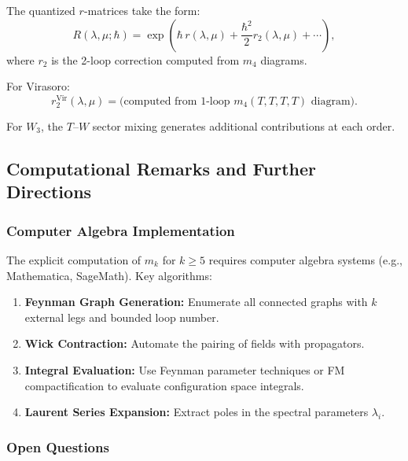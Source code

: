 The quantized $r$-matrices take the form:
\begin{equation}
R(\lambda,\mu; \hbar) = \exp\left( \hbar \, r(\lambda,\mu) + \frac{\hbar^2}{2} r_2(\lambda,\mu) + \cdots \right),
\end{equation}
where $r_2$ is the 2-loop correction computed from $m_4$ diagrams.

For Virasoro:
\begin{equation}
r_2^{\text{Vir}}(\lambda,\mu) = \text{(computed from 1-loop } m_4(T,T,T,T) \text{ diagram)}.
\end{equation}

For $W_3$, the $T$--$W$ sector mixing generates additional contributions at each order.

\subsection{Computational Remarks and Further Directions}

\subsubsection{Computer Algebra Implementation}

The explicit computation of $m_k$ for $k \geq 5$ requires computer algebra systems (e.g., Mathematica, SageMath). Key algorithms:
\begin{enumerate}
\item \textbf{Feynman Graph Generation:} Enumerate all connected graphs with $k$ external legs and bounded loop number.
\item \textbf{Wick Contraction:} Automate the pairing of fields with propagators.
\item \textbf{Integral Evaluation:} Use Feynman parameter techniques or FM compactification to evaluate configuration space integrals.
\item \textbf{Laurent Series Expansion:} Extract poles in the spectral parameters $\lambda_i$.
\end{enumerate}

\subsubsection{Open Questions}

